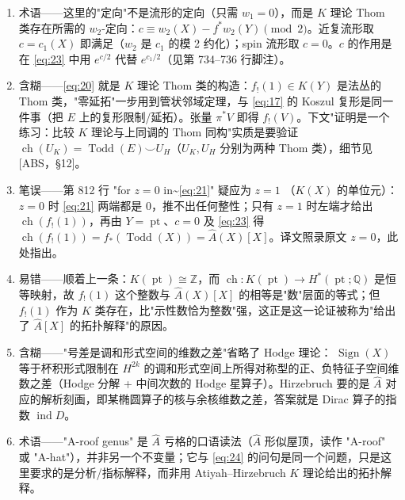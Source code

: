 \documentclass[11pt]{amsart}
\theoremstyle{definition}
\theoremstyle{remark}
\theoremstyle{plain}
\numberwithin{equation}{section}
\renewcommand{\:}{\colon}
\newcommand{\Ahat}{{\hat A}}
\DeclareMathOperator{\pt}{pt}
\newcommand{\QQ}{{\mathbb Q}}
\newcommand{\ZZ}{{\mathbb Z}}
\DeclareMathOperator{\ch}{ch}
\DeclareMathOperator{\ind}{ind}
\DeclareMathOperator{\Sign}{Sign}
\DeclareMathOperator{\Todd}{Todd}
\begin{document}
\begin{enumerate}[leftmargin=2.2em,itemsep=2pt,topsep=2pt]
  \item 术语——这里的"定向"不是流形的定向（只需 $w_1=0$），而是 $K$ 理论 Thom 类存在所需的 $w_2$-定向：$c\equiv w_2(X)-f^*w_2(Y)\pmod2$。近复流形取 $c=c_1(X)$ 即满足（$w_2$ 是 $c_1$ 的模 2 约化）；spin 流形取 $c=0$。$c$ 的作用是在 \eqref{eq:23} 中用 $e^{c/2}$ 代替 $e^{c_1/2}$（见第 734–736 行脚注）。
  \item 含糊——\eqref{eq:20} 就是 $K$ 理论 Thom 类的构造：$f_!(1)\in K(Y)$ 是法丛的 Thom 类，"零延拓"一步用到管状邻域定理，与 \eqref{eq:17} 的 Koszul 复形是同一件事（把 $E$ 上的复形限制/延拓）。张量 $\pi^*V$ 即得 $f_!(V)$。下文"证明是一个练习：比较 $K$ 理论与上同调的 Thom 同构"实质是要验证 $\ch(U_K)=\Todd(E)\smile U_H$（$U_K,U_H$ 分别为两种 Thom 类），细节见 [ABS，\S12]。
  \item 笔误——第 812 行 "for $z=0$ in\textasciitilde{}\eqref{eq:21}" 疑应为 $z=1$ （$K(X)$ 的单位元）：$z=0$ 时 \eqref{eq:21} 两端都是 0，推不出任何整性；只有 $z=1$ 时左端才给出 $\ch(f_!(1))$，再由 $Y=\pt$、$c=0$ 及 \eqref{eq:23} 得 $\ch(f_!(1))=f_*(\Todd(X))=\Ahat(X)[X]$。译文照录原文 $z=0$，此处指出。
  \item 易错——顺着上一条：$K(\pt)\cong\ZZ$，而 $\ch:K(\pt)\to H^*(\pt;\QQ)$ 是恒等映射，故 $f_!(1)$ 这个整数与 $\Ahat(X)[X]$ 的相等是"数"层面的等式；但 $f_!(1)$ 作为 $K$ 类存在，比"示性数恰为整数"强，这正是这一论证被称为"给出了 $\Ahat[X]$ 的拓扑解释"的原因。
  \item 含糊——"号差是调和形式空间的维数之差"省略了 Hodge 理论： $\Sign(X)$ 等于杯积形式限制在 $H^{2k}$ 的调和形式空间上所得对称型的正、负特征子空间维数之差（Hodge 分解 + 中间次数的 Hodge 星算子）。Hirzebruch 要的是 $\Ahat$ 对应的解析刻画，即某椭圆算子的核与余核维数之差，答案就是 Dirac 算子的指数 $\ind D$。
  \item 术语——"A-roof genus" 是 $\Ahat$ 亏格的口语读法（$\hat A$ 形似屋顶，读作 "A-roof" 或 "A-hat"），并非另一个不变量；它与 \eqref{eq:24} 的问句是同一个问题，只是这里要求的是分析/指标解释，而非用 Atiyah–Hirzebruch $K$ 理论给出的拓扑解释。
\end{enumerate}
\end{document}
